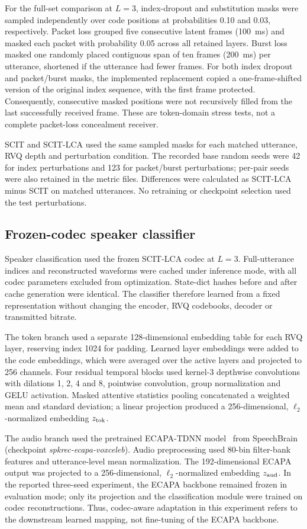 \documentclass[final,5p,times,twocolumn]{elsarticle}
\begin{document}
For the full-set comparison at $L=3$, index-dropout and substitution masks were sampled independently over code positions at probabilities 0.10 and 0.03, respectively. Packet loss grouped five consecutive latent frames (100~ms) and masked each packet with probability 0.05 across all retained layers. Burst loss masked one randomly placed contiguous span of ten frames (200~ms) per utterance, shortened if the utterance had fewer frames. For both index dropout and packet/burst masks, the implemented replacement copied a one-frame-shifted version of the original index sequence, with the first frame protected. Consequently, consecutive masked positions were not recursively filled from the last successfully received frame. These are token-domain stress tests, not a complete packet-loss concealment receiver.

SCIT and SCIT-LCA used the same sampled masks for each matched utterance, RVQ depth and perturbation condition. The recorded base random seeds were 42 for index perturbations and 123 for packet/burst perturbations; per-pair seeds were also retained in the metric files. Differences were calculated as SCIT-LCA minus SCIT on matched utterances. No retraining or checkpoint selection used the test perturbations.

\subsection{Frozen-codec speaker classifier}
Speaker classification used the frozen SCIT-LCA codec at $L=3$. Full-utterance indices and reconstructed waveforms were cached under inference mode, with all codec parameters excluded from optimization. State-dict hashes before and after cache generation were identical. The classifier therefore learned from a fixed representation without changing the encoder, RVQ codebooks, decoder or transmitted bitrate.

The token branch used a separate 128-dimensional embedding table for each RVQ layer, reserving index 1024 for padding. Learned layer embeddings were added to the code embeddings, which were averaged over the active layers and projected to 256 channels. Four residual temporal blocks used kernel-3 depthwise convolutions with dilations 1, 2, 4 and 8, pointwise convolution, group normalization and GELU activation. Masked attentive statistics pooling concatenated a weighted mean and standard deviation; a linear projection produced a 256-dimensional, $\ell_2$-normalized embedding $z_{\rm tok}$.

The audio branch used the pretrained ECAPA-TDNN model~\cite{ecapa} from SpeechBrain (checkpoint \textit{spkrec-ecapa-voxceleb}). Audio preprocessing used 80-bin filter-bank features and utterance-level mean normalization. The 192-dimensional ECAPA output was projected to a 256-dimensional, $\ell_2$-normalized embedding $z_{\rm aud}$. In the reported three-seed experiment, the ECAPA backbone remained frozen in evaluation mode; only its projection and the classification module were trained on codec reconstructions. Thus, codec-aware adaptation in this experiment refers to the downstream learned mapping, not fine-tuning of the ECAPA backbone.
\end{document}
